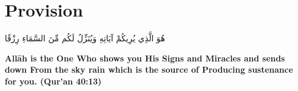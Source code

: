 \chapter{Provision}
\begin{center}
    {\Huge    
        \begin{Arabic}
            هُوَ الَّذِي يُرِيكُمْ آيَاتِهِ وَيُنَزِّلُ لَكُم مِّنَ السَّمَاءِ رِزْقًا
        \end{Arabic}
    }
\end{center}
\vspace*{\fill}
\vspace{3cm}
\begin{center}
    \large \textbf{Allāh is the One Who shows you His Signs and Miracles and sends down From the sky rain which is the source of Producing sustenance for you. (Qur'an 40:13)}
\end{center}
